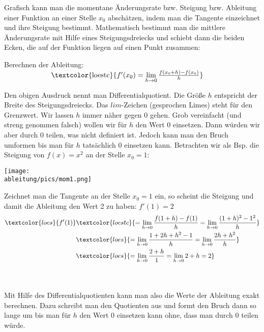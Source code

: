 Grafisch kann man die momentane Änderungsrate bzw. Steigung bzw. Ableitung einer Funktion an einer Stelle \(x_0\) abschätzen, indem man die Tangente einzeichnet und ihre Steigung bestimmt. Mathematisch bestimmt man die mittlere Änderungsrate mit Hilfe eines Steigungsdreiecks und schiebt dann die beiden Ecken, die auf der Funktion liegen auf einen Punkt zusammen:
\begin{tcolorbox}
	Berechnen der Ableitung:\\
	$\makebox[\linewidth]{\textcolor{loestc}{\(f'(x_0)=\lim\limits_{h\to 0}\frac{f(x_0+h)-f(x_0)}{h}\)}}$
\end{tcolorbox}
Den obigen Ausdruck nennt man Differentialquotient. Die Größe \(h\) entspricht der Breite des Steigungsdreiecks. Das \(lim\)-Zeichen (gesprochen Limes) steht für den Grenzwert. Wir lassen \(h\) immer näher gegen \(0\) gehen. Grob vereinfacht (und streng genommen falsch) wollen wir für \(h\) den Wert \(0\) einsetzen. Dann würden wir aber durch \(0\) teilen, was nicht definiert ist. Jedoch kann man den Bruch umformen bis man für \(h\) tatsächlich \(0\) einsetzen kann. Betrachten wir als Bsp. die Steigung von \(f(x)=x^2\) an der Stelle \(x_0=1\):\\
\begin{minipage}[t]{\textwidth}
	\begin{minipage}{0.4\textwidth}
		\centering\texttt{[image: \\ableitung/pics/mom1.png]}
	\end{minipage}
	\begin{minipage}{0.6\textwidth}
		\textcolor{loes}{Zeichnet man die Tangente an der Stelle \(x_0=1\) ein, so scheint die Steigung und damit die Ableitung den Wert 2 zu haben: \(f'(1)=2\)}\\
		\begin{align*}
			\textcolor{loes}{f'(1)}&\textcolor{loestc}{=\lim\limits_{h\to 0}\frac{f(1+h)-f(1)}{h}=\lim\limits_{h\to 0}\frac{(1+h)^2-1^2}{h}}\\
			&\textcolor{loes}{=\lim\limits_{h\to 0}\frac{1+2h+h^2-1}{h}=\lim\limits_{h\to 0}\frac{2h+h^2}{h}}\\
			&\textcolor{loes}{=\lim\limits_{h\to 0}\frac{2+h}{1}=\lim\limits_{h\to 0}2+h=2}
		\end{align*}
	\end{minipage}
\end{minipage}\\
\phantom{text}\\Mit Hilfe des Differentialquotienten kann man also die Werte der Ableitung exakt berechnen. Dazu schreibt man den Quotienten aus und formt den Bruch dann so lange um bis man für \(h\) den Wert \(0\) einsetzen kann ohne, dass man durch \(0\) teilen würde.\\
